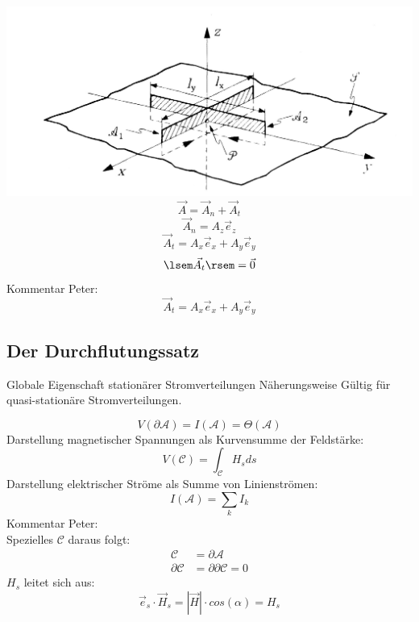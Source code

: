 \documentclass[12pt]{article}
\begin{document}
\includegraphics[width=15cm]{pic/abb14-5x2nr}
\begin{equation}\label{key}
\vec{A} = \vec{A}_n + \vec{A}_t
\end{equation}
\begin{equation}\label{key}
\vec{A}_n = A_z \vec{e}_z
\end{equation}
\begin{equation}\label{key}
\vec{A}_t = A_x \vec{e}_x + A_y \vec{e}_y
\end{equation}
\begin{equation}\label{key}


\lsem \vec{A_t} \rsem = \vec{0}

\end{equation}
Kommentar Peter: 
\begin{equation}\label{key}
\vec{A}_t = A_x \vec{e}_x + A_y \vec{e}_y
\end{equation}
\subsection{Der Durchflutungssatz}

Globale Eigenschaft stationärer Stromverteilungen Näherungsweise Gültig für quasi-stationäre Stromverteilungen. 

\begin{equation}\label{key}
V(\partial \mathcal{A})= I (\mathcal{A}) = \Theta(\mathcal{A})
\end{equation}
\noindent
Darstellung magnetischer Spannungen als Kurvensumme der Feldstärke:
\begin{equation}\label{key}
V(\mathcal{C}) = \int_{\mathcal{C}} H_s ds
\end{equation}
\noindent
Darstellung elektrischer Ströme als Summe von Linienströmen: 
\begin{equation}\label{key}
I(\mathcal{A}) = \sum_k I_k 
\end{equation} %
Kommentar Peter: \\ 
\noindent
Spezielles \(\mathcal{C}\) daraus folgt:  \begin{align}
\mathcal{C}&=\partial \mathcal{A}\\
\partial \mathcal{C} &= \partial  \partial \mathcal{C} = 0
\end{align}
\(H_s\) leitet sich aus: 
\begin{equation}\label{key}
\vec{e}_s \cdot \vec{H}_s = | \vec{H}| \cdot cos(\alpha) = H_s 
\end{equation}
\end{document}
